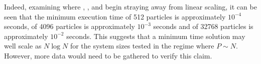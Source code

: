 Indeed, examining where
,
,
 and
begin straying away from linear scaling,
it can be seen that the minimum execution time
of 512 particles is approximately $10^{-4}$ seconds,
of 4096 particles is approximately $10^{-3}$ seconds and
of 32768 particles is approximately $10^{-2}$ seconds.
%
This suggests that a minimum time solution may well scale as
$N\log{N}$ for the system sizes tested in the regime where $P \sim{} N$.
%
However, more data would need to be gathered to verify this claim.
